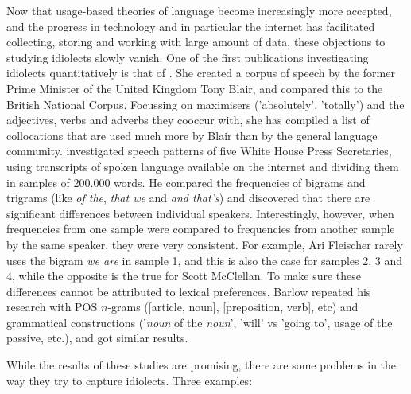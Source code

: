 \documentclass[12pt]{article}
\begin{document}
Now that usage-based theories of language become increasingly more accepted, and the progress in technology and in particular the internet has facilitated collecting, storing and working with large amount of data, these objections to studying idiolects slowly vanish. One of the first publications investigating idiolects quantitatively is that of . She created a corpus of speech by the former Prime Minister of the United Kingdom Tony Blair, and compared this to the British National Corpus. Focussing on maximisers ('absolutely', 'totally') and the adjectives, verbs and adverbs they cooccur with, she has compiled a list of collocations that are used much more by Blair than by the general language community.  investigated speech patterns of five White House Press Secretaries, using transcripts of spoken language available on the internet and dividing them in samples of 200.000 words. He compared the frequencies of bigrams and trigrams (like \emph{of the}, \emph{that we} and \emph{and that's}) and discovered that there are significant differences between individual speakers. Interestingly, however, when frequencies from one sample were compared to frequencies from another sample by the same speaker, they were very consistent. For example, Ari Fleischer rarely uses the bigram \emph{we are} in sample 1, and this is also the case for samples 2, 3 and 4, while the opposite is the true for Scott McClellan. To make sure these differences cannot be attributed to lexical preferences, Barlow repeated his research with POS $n$-grams ([article, noun], [preposition, verb], etc) and 
grammatical constructions ('\emph{noun} of the \emph{noun}',  'will' vs 'going to', usage of the passive, etc.), and got similar results.

While the results of these studies are promising, there are some problems in the way they try to capture idiolects. Three examples:
\end{document}
